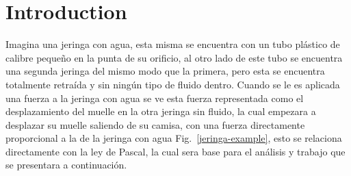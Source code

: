 \begin{IEEEkeywords}

\end{IEEEkeywords}






%
\IEEEpeerreviewmaketitle













\section{Introduction}

Imagina una jeringa con agua, esta misma se encuentra con un tubo plástico de calibre pequeño en la punta de su orificio, al otro lado de este tubo se encuentra una segunda jeringa del mismo modo que la primera, pero esta se encuentra totalmente retraída y sin ningún tipo de fluido dentro. Cuando se le es aplicada una fuerza a la jeringa con agua se ve esta fuerza representada como el desplazamiento del muelle en la otra jeringa sin fluido, la cual empezara a desplazar su muelle saliendo de su camisa, con una fuerza directamente proporcional a la de la jeringa con agua Fig.~\ref{jeringa-example}, esto se relaciona directamente con la ley de Pascal, la cual sera base para el análisis y trabajo que se presentara a continuación.


